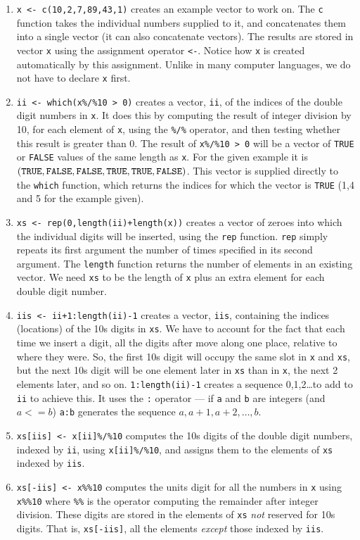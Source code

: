 \documentclass[10pt] {article}
\theoremstyle{definition}
\begin{document}
\begin{enumerate}
\item \lstinline+x <- c(10,2,7,89,43,1)+ creates an example vector to work on. The {\tt c} function takes the individual numbers supplied to it, and concatenates them into a single vector (it can also concatenate vectors). The results are stored in vector \lstinline+x+ using the assignment operator \lstinline+<-+. Notice how {\tt x} is created automatically by this assignment. Unlike in many computer languages, we do not have to declare {\tt x} first. 
\item \lstinline+ii <- which(x%/%10 > 0)+ creates a vector, {\tt ii}, of the indices of the double digit numbers in \lstinline+x+. It does this by computing the result of integer division by 10, for each element of {\tt x}, using the \lstinline+%/%+ operator, and then testing whether this result is greater than 0. The result of \lstinline+x%/%10 > 0+ will be a vector of {\tt TRUE} or {\tt FALSE} values of the same length as {\tt x}. For the given example it is $({\tt TRUE},{\tt FALSE},{\tt FALSE},{\tt TRUE},{\tt TRUE},{\tt FALSE})$. This vector is supplied directly to the {\tt which} function, which returns the indices for which the vector is {\tt TRUE} (1,4 and 5 for the example given). 
\item \lstinline^xs <- rep(0,length(ii)+length(x))^ creates a vector of zeroes into which the individual digits will be inserted, using the {\tt rep} function. {\tt rep} simply repeats its first argument the number of times specified in its second argument. The {\tt length} function returns the number of elements in an existing vector. We need {\tt xs} to be the length of {\tt x} plus an extra element for each double digit number.
\item \lstinline^iis <- ii+1:length(ii)-1^ creates a vector, {\tt iis}, containing the indices (locations) of the 10s digits in {\tt xs}. We have to account for the fact that each time we insert a digit, all the digits after move along one place, relative to where they were. So, the first 10s digit will occupy the same slot in {\tt x} and {\tt xs}, but the next 10s digit will be one element later in {\tt xs} than in {\tt x}, the next 2 elements later, and so on. \lstinline+1:length(ii)-1+ creates a sequence 0,1,2\ldots to add to {\tt ii} to achieve this. It uses the \lstinline+:+ operator --- if {\tt a} and {\tt b} are integers (and $a<=b$) \lstinline+a:b+ generates the sequence $a,a+1,a+2,\ldots,b$.
\item \lstinline+xs[iis] <- x[ii]%/%10+ computes the 10s digits of the double digit numbers, indexed by {\tt ii}, using \lstinline+x[ii]%/%10+, and assigns them to the elements of {\tt xs} indexed by {\tt iis}.
\item \lstinline+xs[-iis] <- x%%10+ computes the units digit for all the numbers in {\tt x} using \lstinline+x%%10+ where \lstinline+%%+ is the operator computing the remainder after integer division. These digits are stored in the elements of {\tt xs} {\em not} reserved for 10s digits. That is, \lstinline+xs[-iis]+, all the elements {\em except} those indexed by {\tt iis}. 
\end{enumerate}
\end{document}
